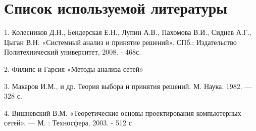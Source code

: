 \documentclass[a4paper, 12pt]{article}		%
\begin{document}
\section*{Список используемой литературы}

1.	Колесников Д.Н., Бендерская Е.Н., Лупин А.В., Пахомова В.И., Сиднев А.Г., Цыган В.Н. «Системный анализ и принятие решений». СПб.: Издательство Политехнический университет, 2008. - 468с.

2.  Филипс и Гарсия «Методы анализа сетей»

3.	Макаров И.М., и др. Теория выбора и принятия решений. М. Наука. 1982. — 328 с.

4.	Вишневский В.М. «Теоретические основы проектирования компьютерных сетей». — М. : Техносфера, 2003. - 512 с

\end{document}
